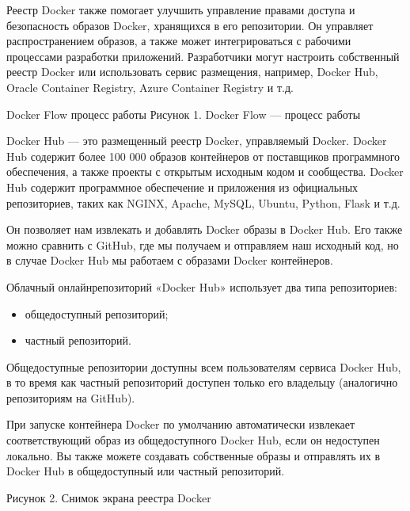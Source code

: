 \documentclass[letterpaper,10pt,russian]{sphinxmanual}
\begin{document}
\sphinxAtStartPar
Реестр Docker также помогает улучшить управление правами доступа и безопасность образов Docker, хранящихся в его репозитории. Он управляет распространением образов, а также может интегрироваться с рабочими процессами разработки приложений. Разработчики могут настроить собственный реестр Docker или использовать сервис размещения, например, Docker Hub, Oracle Container Registry, Azure Container Registry и т.д.

\sphinxAtStartPar
{}
\sphinxhyphen{}Docker Flow \sphinxhyphen{} процесс работы
Рисунок 1. Docker Flow — процесс работы

\sphinxAtStartPar
Docker Hub — это размещенный реестр Docker, управляемый Docker. Docker Hub содержит более 100 000 образов контейнеров от поставщиков программного обеспечения, а также проекты с открытым исходным кодом и сообщества. Docker Hub содержит программное обеспечение и приложения из официальных репозиториев, таких как NGINX, Apache, MySQL, Ubuntu, Python, Flask и т.д.

\sphinxAtStartPar
Он позволяет нам извлекать и добавлять Doсker образы в Docker Hub.
Его также можно сравнить с GitHub, где мы получаем и отправляем наш исходный код, но в случае Docker Hub мы работаем с образами Docker контейнеров.

\sphinxAtStartPar
Облачный онлайн\sphinxhyphen{}репозиторий «Docker Hub» использует два типа репозиториев:
\begin{itemize}
\item {} 
\sphinxAtStartPar
общедоступный репозиторий;

\item {} 
\sphinxAtStartPar
частный репозиторий.

\end{itemize}

\sphinxAtStartPar
Общедоступные репозитории доступны всем пользователям сервиса Docker Hub, в то время как частный репозиторий доступен только его владельцу (аналогично репозиториям на GitHub).

\sphinxAtStartPar
При запуске контейнера Docker по умолчанию автоматически извлекает соответствующий образ из общедоступного Docker Hub, если он недоступен локально. Вы также можете создавать собственные образы и отправлять их в Docker Hub в общедоступный или частный репозиторий.

\sphinxAtStartPar
{}

\sphinxAtStartPar
Рисунок 2. Снимок экрана реестра Docker
\end{document}
